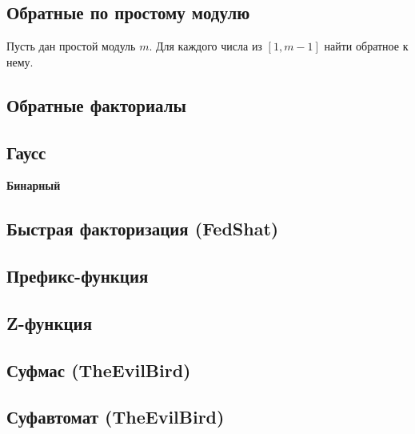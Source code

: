 \documentclass[a4paper]{article}
\begin{document}
\begin{multicols*}{2}
        \subsection{Обратные по простому модулю}
            Пусть дан простой модуль $m$. Для каждого числа из $[1, m - 1]$ найти обратное к нему.
            
        
        \subsection{Обратные факториалы}
            
        
        \subsection{Гаусс}
            
            
            \textbf{Бинарный}
            
        
        \subsection{Быстрая факторизация (FedShat)}
            

        \subsection{Префикс-функция}
            
            
        \subsection{Z-функция}
            
            
        \subsection{Суфмас (TheEvilBird)}
            
            
        \subsection{Суфавтомат (TheEvilBird)}
            
        

\end{multicols*}
\end{document}
